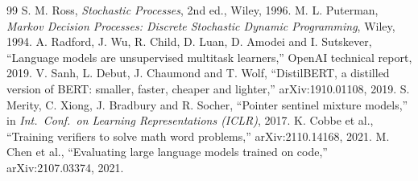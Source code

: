 \documentclass[10pt]{article}
\theoremstyle{remark}
\begin{document}
\begin{thebibliography}{99}
 S. M. Ross, \emph{Stochastic Processes}, 2nd ed., Wiley, 1996.
 M. L. Puterman, \emph{Markov Decision Processes: Discrete Stochastic Dynamic Programming},
Wiley, 1994.
 A. Radford, J. Wu, R. Child, D. Luan, D. Amodei and I. Sutskever, ``Language models are
unsupervised multitask learners,'' OpenAI technical report, 2019.
 V. Sanh, L. Debut, J. Chaumond and T. Wolf, ``DistilBERT, a distilled version of BERT: smaller,
faster, cheaper and lighter,'' arXiv:1910.01108, 2019.
 S. Merity, C. Xiong, J. Bradbury and R. Socher, ``Pointer sentinel mixture models,'' in
\emph{Int.\ Conf.\ on Learning Representations (ICLR)}, 2017.
 K. Cobbe et al., ``Training verifiers to solve math word problems,'' arXiv:2110.14168, 2021.
 M. Chen et al., ``Evaluating large language models trained on code,'' arXiv:2107.03374, 2021.
\end{thebibliography}
\end{document}
